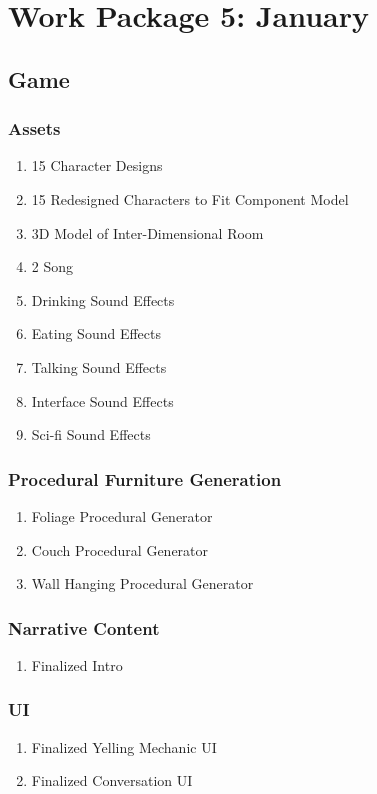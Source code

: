 
\section{Work Package 5: January}
\subsection{Game}
\subsubsection{Assets}
\begin{enumerate}
\item 15 Character Designs
\item 15 Redesigned Characters to Fit Component Model
\item 3D Model of Inter-Dimensional Room
\item 2 Song
\item Drinking Sound Effects
\item Eating Sound Effects
\item Talking Sound Effects
\item Interface Sound Effects
\item Sci-fi Sound Effects
\end{enumerate}
\subsubsection{Procedural Furniture Generation}
\begin{enumerate}
\item Foliage Procedural Generator
\item Couch Procedural Generator
\item Wall Hanging Procedural Generator
\end{enumerate}
\subsubsection{Narrative Content}
\begin{enumerate}
\item Finalized Intro
\end{enumerate}
\subsubsection{UI}
\begin{enumerate}
\item Finalized Yelling Mechanic UI
\item Finalized Conversation UI
\end{enumerate}
